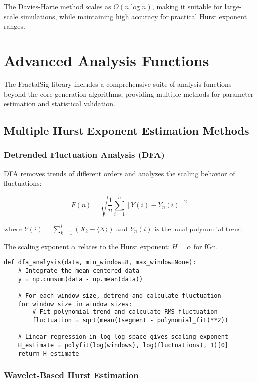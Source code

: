 \documentclass[11pt,a4paper]{article}
\begin{document}
The Davies-Harte method scales as $O(n \log n)$, making it suitable for large-scale simulations, while maintaining high accuracy for practical Hurst exponent ranges.

\section{Advanced Analysis Functions}

The FractalSig library includes a comprehensive suite of analysis functions beyond the core generation algorithms, providing multiple methods for parameter estimation and statistical validation.

\subsection{Multiple Hurst Exponent Estimation Methods}

\subsubsection{Detrended Fluctuation Analysis (DFA)}

DFA removes trends of different orders and analyzes the scaling behavior of fluctuations:

\begin{equation}
F(n) = \sqrt{\frac{1}{n} \sum_{i=1}^{n} [Y(i) - Y_n(i)]^2}
\end{equation}

where $Y(i) = \sum_{k=1}^{i} (X_k - \langle X \rangle)$ and $Y_n(i)$ is the local polynomial trend.

The scaling exponent $\alpha$ relates to the Hurst exponent: $H = \alpha$ for fGn.

\begin{lstlisting}
def dfa_analysis(data, min_window=8, max_window=None):
    # Integrate the mean-centered data
    y = np.cumsum(data - np.mean(data))
    
    # For each window size, detrend and calculate fluctuation
    for window_size in window_sizes:
        # Fit polynomial trend and calculate RMS fluctuation
        fluctuation = sqrt(mean((segment - polynomial_fit)**2))
    
    # Linear regression in log-log space gives scaling exponent
    H_estimate = polyfit(log(windows), log(fluctuations), 1)[0]
    return H_estimate
\end{lstlisting}

\subsubsection{Wavelet-Based Hurst Estimation}
\end{document}
